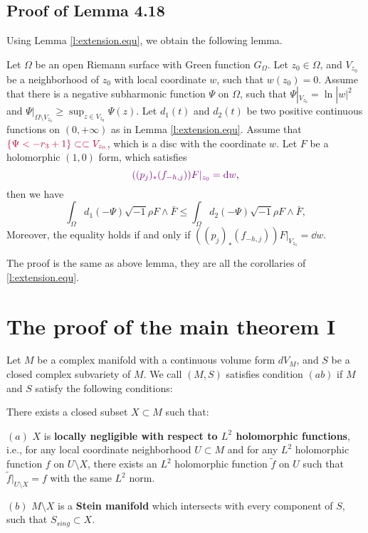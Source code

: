 \subsection{Proof of Lemma 4.18}

Using Lemma \ref{l:extension.equ}, we obtain the following lemma.

\begin{lem}
\label{l:extension_equ.extended} { \color{violet} Let $\Omega$ be an open Riemann
surface with Green function $G_{\Omega}$.} Let $z_{0}\in\Omega$, and
$V_{z_0}$ be a neighborhood of $z_{0}$ with local coordinate $w$,
such that $w(z_{0})=0$. Assume that there is a negative subharmonic
function $\Psi$ on $\Omega$, such that $\Psi|_{V_{z_0}}=\ln|w|^{2}$
and $\Psi|_{\Omega\setminus V_{z_0}}\geq\sup_{z\in V_{z_0}}\Psi(z)$.
Let $d_{1}(t)$ and $d_{2}(t)$ be two positive continuous functions
on $(0,+\infty)$ as in Lemma \ref{l:extension.equ}. Assume that
${\color{purple}\{\Psi<-r_{3}+1\}\subset\subset V_{z_0}}$, which is a disc with the
coordinate $w$. Let $F$ be a holomorphic $(1,0)$ form, which
satisfies $${ \color{violet} ((p_{j})_{*}(f_{-h,j}))F|_{z_{0}}=\dd w},$$ then we have
$$\int_{\Omega}d_{1}(-\Psi)\sqrt{-1}\rho F\wedge\bar{F}\leq\int_{\Omega}d_{2}(-\Psi)\sqrt{-1}\rho F\wedge\bar{F},$$
Moreover, the equality holds if and only if $((p_{j})_{*}(f_{-h,j}))F|_{V_{z_0}}=\dd w$.
\end{lem}
The proof is the same as above lemma, they are all the corollaries of \ref{l:extension.equ}.

\section{The proof of the main theorem I}
  
\begin{defi}
  Let $M$ be a complex manifold with a continuous volume form
  $dV_{M}$, and $S$ be a closed complex subvariety of $M$. We call
  $(M,S)$ satisfies condition $(ab)$ if $M$ and $S$ satisfy the
  following conditions:
  
  There exists a closed subset $X\subset M$ such that:
  
  $(a)$ $X$ is \textbf{locally negligible with respect to $L^2$ holomorphic
  functions}, i.e., for any local coordinate neighborhood $U\subset M$
  and for any $L^2$ holomorphic function $f$ on $U\setminus X$, there
  exists an $L^2$ holomorphic function $\tilde{f}$ on $U$ such that
  $\tilde{f}|_{U\setminus X}=f$ with the same $L^{2}$ norm.
  
  $(b)$ $M\setminus X$ is a \textbf{Stein manifold} which intersects with every component of $S$,
  such that $S_{sing}\subset X$.
  \end{defi}
  
